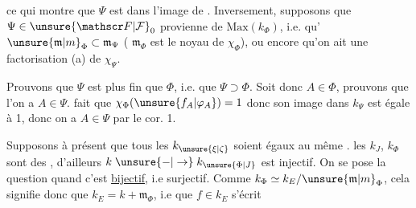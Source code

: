 ce qui montre que $\Psi$ est dans l'image de . Inversement, supposons que $\Psi\in\unsure{\mathscr F|\mathcal F}_0$ provienne de $\mathrm{Max}(k_\Phi)$, i.e. qu'  $\unsure{\mathfrak m|m}_\Phi\subset\mathfrak m_\Psi$ \deleted{\unsure{(}} ( $\mathfrak m_\Phi$ est le noyau de $\chi_\Phi$), ou encore qu'on ait une factorisation (a) de $\chi_\Psi$.

Prouvons que $\Psi$ est plus fin que $\Phi$, i.e. que $\Psi\supset\Phi$. Soit donc $A\in\Phi$, prouvons que l'on a $A\in\Psi$.    fait que  $\chi_\Phi(\unsure{f_A|\varphi_A})=1$   donc son image dans $k_\Psi$ est  égale à 1, donc on a $A\in\Psi$ par le cor. 1.  




Supposons à présent que tous les $k_{\unsure{\xi|\zeta}}$ soient égaux au même .    les $k_J$, $k_\Phi$ sont des , d'ailleurs $k\mathrel{\unsure{-|\to}}k_{\unsure{\Phi|J}}$  est injectif. On se pose la question quand  c'est \uline{bijectif}, i.e surjectif. Comme $k_\Phi\simeq k_E/\unsure{\mathfrak m|m}_\Phi$, cela signifie donc que $k_E=k+\mathfrak m_\Phi$, i.e que  $f\in k_E$ s'écrit


